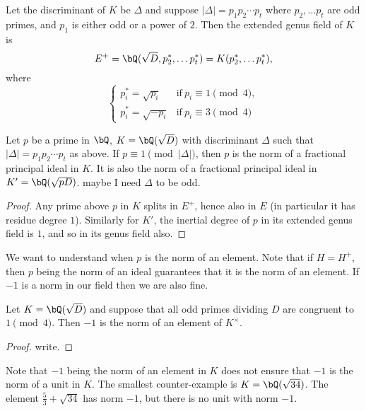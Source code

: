 \begin{thm} 
Let the discriminant of $K$ be $\Delta$ and suppose $|\Delta| = p_1 p_2 \cdots p_t$ where $p_2, \ldots p_t$ are odd primes, and $p_1$ is either odd or a power of $2$. Then the extended genus field of $K$ is 
    \[ E^{+} = \bQ(\sqrt{D}, p_2^*, \ldots p_t^*) = K(p_2^*, \ldots p_t^*), \] 
where 
\[ \begin{cases}
    p_i^* = \sqrt{p_i} & \mathrm{if }\ p_i \equiv 1 \pmod 4, \\
    p_i^* = \sqrt{-p_i} & \mathrm{if }\ p_i \equiv 3 \pmod 4
\end{cases}\]
\end{thm} 

\begin{cor}\label{p-one-mod-disc}
    Let $p$ be a prime in $\bQ$, $K = \bQ(\sqrt{D})$ with discriminant $\Delta$ such that $|\Delta| = p_1 p_2 \cdots p_t$ as above. If $p \equiv 1 \pmod {|\Delta|}$, then $p$ is the norm of a fractional principal ideal in $K$. It is also the norm of a fractional principal ideal in $K' = \bQ({\sqrt{pD}})$. {\color{red} maybe I need $\Delta$ to be odd.}
\end{cor}

\begin{proof}
    Any prime above $p$ in $K$ splits in $E^{+}$, hence also in $E$ (in particular it has residue degree $1$). Similarly for $K'$, the inertial degree of $p$ in its extended genus field is $1$, and so in its genus field also.
\end{proof}

We want to understand when $p$ is the norm of an element. Note that if $H = H^{+}$, then $p$ being the norm of an ideal guarantees that it is the norm of an element. If $-1$ is a norm in our field then we are also fine. 

\begin{thm}\label{minus-one-norm}
Let $K = \bQ(\sqrt{D})$ and suppose that all odd primes dividing $D$ are congruent to $1 \pmod 4$. Then $-1$ is the norm of an element of $K^{\times}$. 
\end{thm}

\begin{proof}
{\color{red} write.}
\end{proof}

Note that $-1$ being the norm of an element in $K$ does not ensure that $-1$ is the norm of a unit in $K$. The smallest counter-example is $K = \bQ(\sqrt{34})$. The element $\frac{5}{3} + \sqrt{34}$ has norm $-1$, but there is no unit with norm $-1$. 

